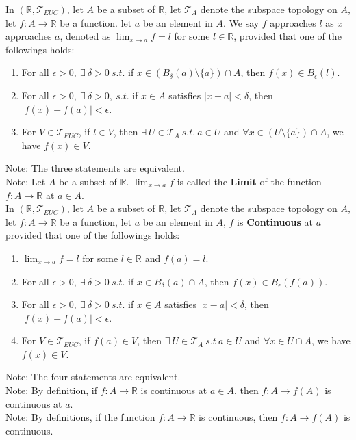 \documentclass[11pt]{article}
\newcommand{\R}{\mathbb{R}}
\newcommand{\T}{\mathcal{T}}
\newcommand{\note}{\color{gray}Note: \color{black}}
\begin{document}
		\noindent In $(\R,\T_{EUC})$, let $A$ be a subset of $\R$, let $\T_A$ denote the subspace topology on $A$, let $f:A \to \R$ be a function. let $a$ be an element in $A$. We say $f$ approaches $l$ as $x$ approaches $a$, denoted as $\lim_{x \to a} f = l$ for some $l \in \R$, provided that one of the followings holds:
		\begin{enumerate}[topsep=3pt,itemsep=-1ex,partopsep=1ex,parsep=1ex]
		\item For all $\epsilon >0, \ \exists \ \delta >0 \ s.t.$ if $x \in (B_{\delta}(a) \setminus \{ a \} )\cap A$, then $f(x) \in B_{\epsilon}(l)$.
		\item For all $\epsilon >0, \ \exists \ \delta >0, \ s.t.$ if $x \in A$ satisfies $|x-a|<\delta$, then $|f(x) - f(a)| < \epsilon$.
		\item For $V \in \T_{EUC}$, if $l \in V$, then $\exists \ U \in \T_A \ s.t. \ a \in U$ and $\forall x \in (U \setminus \{a \})\cap A$, we have $f(x) \in V$.
		\end{enumerate}
		\note The three statements are equivalent.\\
		\note Let $A$ be a subset of $\R$. $\lim_{x \to a} f$ is called the \textbf{Limit} of the function $f:A \to \R$ at $a \in A$.\\

		\noindent In $(\R,\T_{EUC})$, let $A$ be a subset of $\R$, let $\T_A$ denote the subspace topology on $A$, let $f:A \to \R$ be a function, let $a$ be an element in $A$, $f$ is \textbf{Continuous} at $a$ provided that one of the followings holds:
		\begin{enumerate}[topsep=3pt,itemsep=-1ex,partopsep=1ex,parsep=1ex]
			\item $\lim_{x \to a} f = l$ for some $l \in \R$ and $f(a)=l$.		
			\item For all $\epsilon>0, \ \exists \ \delta>0 \ s.t.$ if $x \in B_{\delta}(a) \cap A$, then $f(x) \in B_{\epsilon}(f(a))$.
			\item For all $\epsilon >0, \ \exists \ \delta >0 \ s.t.$ if $x \in A$ satisfies $| x-a | < \delta$, then $| f(x)-f(a) | < \epsilon$.
			\item For $V \in \T_{EUC}$, if $f(a) \in V$, then $\exists \ U \in \T_A \ s.t \ a \in U$ and $\forall x \in U \cap A$, we have $f(x) \in V$.
		\end{enumerate}
		\note The four statements are equivalent.\\
		\note By definition, if $f:A \to \R$ is continuous at $a \in A$, then  $f:A \to f(A)$ is continuous at $a$.\\
		\note By definitions, if the function $f:A \to \R$ is continuous, then  $f:A \to f(A)$ is continuous.\\
		
\end{document}
